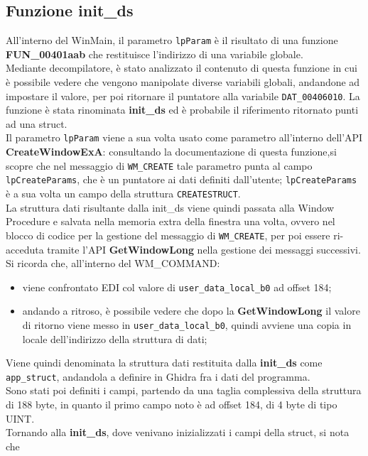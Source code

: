 \documentclass[12pt]{extarticle}
\begin{document}
\subsection{Funzione init\_ds}
All'interno del WinMain, il parametro \texttt{lpParam} è il risultato di una funzione \textbf{FUN\_00401aab} che restituisce l'indirizzo di una variabile globale.\\Mediante decompilatore, è stato analizzato il contenuto di questa funzione in cui è possibile vedere che vengono manipolate diverse variabili globali, andandone ad impostare il valore, per poi ritornare il puntatore alla variabile \texttt{DAT\_00406010}.
La funzione è stata rinominata \textbf{init\_ds} ed è probabile il riferimento ritornato punti ad una struct.\\Il parametro \texttt{lpParam} viene a sua volta usato come parametro all'interno dell'API \textbf{CreateWindowExA}: consultando la documentazione di questa funzione,si scopre che nel messaggio di \texttt{WM\_CREATE} tale parametro punta al campo \texttt{lpCreateParams}, che è un puntatore ai dati definiti dall'utente; \texttt{lpCreateParams} è a sua volta un campo della struttura \texttt{CREATESTRUCT}.\\La struttura dati risultante dalla \textsf{init\_ds} viene quindi passata alla Window Procedure e salvata nella memoria extra della finestra una volta, ovvero nel blocco di codice per la gestione del messaggio di \texttt{WM\_CREATE}, per poi essere ri-acceduta tramite l'API \textbf{GetWindowLong} nella gestione dei messaggi successivi.\\ Si ricorda che, all'interno del \textsf{WM\_COMMAND}:
\begin{itemize}
\item viene confrontato EDI col valore di \texttt{user\_data\_local\_b0} ad offset 184;
\item andando a ritroso, è possibile vedere che dopo la \textbf{GetWindowLong} il valore di ritorno viene messo in \texttt{user\_data\_local\_b0}, quindi avviene una copia in locale dell'indirizzo della struttura di dati;
\end{itemize}
Viene quindi denominata la struttura dati restituita dalla \textbf{init\_ds} come \texttt{app\_struct}, andandola a definire in Ghidra fra i dati del programma.\\Sono stati poi definiti i campi, partendo da una taglia complessiva della struttura di 188 byte, in quanto il primo campo noto è ad offset 184, di 4 byte di tipo UINT.\\Tornando alla \textbf{init\_ds}, dove venivano inizializzati i campi della struct, si nota che
\end{document}
